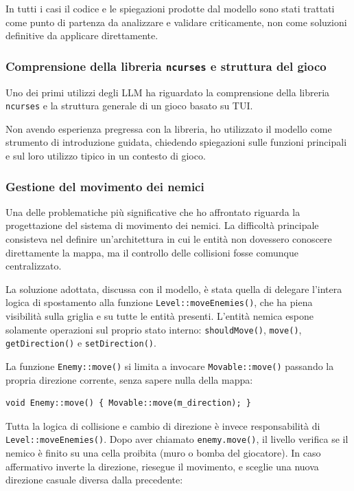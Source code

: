\documentclass[a4paper,11pt]{article}
\begin{document}
In tutti i casi il codice e le spiegazioni prodotte dal modello sono stati trattati
come punto di partenza da analizzare e validare criticamente, non come soluzioni
definitive da applicare direttamente.

\subsubsection{Comprensione della libreria \texttt{ncurses} e struttura del gioco}

Uno dei primi utilizzi degli LLM ha riguardato la comprensione della libreria
\texttt{ncurses} e la struttura generale di un gioco basato su TUI.

Non avendo esperienza pregressa con la libreria, ho utilizzato il modello come
strumento di introduzione guidata, chiedendo spiegazioni sulle funzioni principali
e sul loro utilizzo tipico in un contesto di gioco. 

\subsubsection{Gestione del movimento dei nemici}
 
Una delle problematiche più significative che ho affrontato riguarda la progettazione
del sistema di movimento dei nemici. La difficoltà principale consisteva nel definire
un'architettura in cui le entità non dovessero conoscere direttamente la mappa, ma
il controllo delle collisioni fosse comunque centralizzato.
 
La soluzione adottata, discussa con il modello, è stata quella di delegare l'intera
logica di spostamento alla funzione \texttt{Level::moveEnemies()}, che ha piena
visibilità sulla griglia e su tutte le entità presenti. L'entità nemica espone
solamente operazioni sul proprio stato interno: \texttt{shouldMove()}, \texttt{move()},
\texttt{getDirection()} e \texttt{setDirection()}.
 
La funzione \texttt{Enemy::move()} si limita a invocare \texttt{Movable::move()}
passando la propria direzione corrente, senza sapere nulla della mappa:
 
\begin{verbatim}
void Enemy::move() { Movable::move(m_direction); }
\end{verbatim}
 
Tutta la logica di collisione e cambio di direzione è invece responsabilità di
\texttt{Level::moveEnemies()}. Dopo aver chiamato \texttt{enemy.move()}, il livello
verifica se il nemico è finito su una cella proibita (muro o bomba del giocatore).
In caso affermativo inverte la direzione, riesegue il movimento, e sceglie una nuova
direzione casuale diversa dalla precedente:
 
\end{document}
